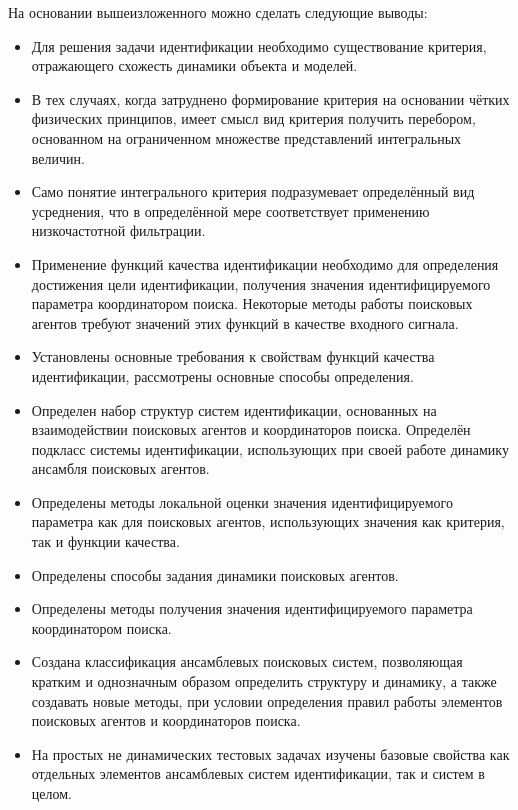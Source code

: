 На основании вышеизложенного можно сделать следующие выводы:

\begin{itemize}

  \item
    Для решения задачи идентификации необходимо существование критерия,
    отражающего схожесть динамики объекта и моделей.

  \item
    В тех случаях, когда затруднено формирование критерия на основании чётких
    физических принципов, имеет смысл вид критерия получить перебором,
    основанном на ограниченном множестве представлений интегральных величин.

  \item
    Само понятие интегрального критерия подразумевает определённый вид усреднения,
    что в определённой мере соответствует применению низкочастотной фильтрации.

  \item
    Применение функций качества идентификации необходимо
    для определения достижения цели идентификации,
    получения значения идентифицируемого параметра координатором поиска.
    Некоторые методы работы поисковых агентов требуют значений
    этих функций в качестве входного сигнала.

  \item
    Установлены основные требования к свойствам функций качества идентификации,
    рассмотрены основные способы определения.

  \item
    Определен набор структур систем идентификации, основанных
    на взаимодействии поисковых агентов и координаторов поиска.
    Определён подкласс системы идентификации, использующих
    при своей работе динамику ансамбля поисковых агентов.

  \item
    Определены методы локальной оценки значения идентифицируемого параметра
    как для поисковых агентов, использующих значения как критерия,
    так и функции качества.

  \item
    Определены способы задания динамики поисковых агентов.

  \item
    Определены методы получения значения идентифицируемого параметра координатором поиска.

  \item
    Создана классификация ансамблевых поисковых систем, позволяющая
    кратким и однозначным образом определить структуру и динамику,
    а также создавать новые методы, при условии определения правил
    работы элементов поисковых агентов и координаторов поиска.

  \item
    На простых не динамических тестовых задачах
    изучены базовые свойства как отдельных элементов ансамблевых систем идентификации,
    так и систем в целом.


\end{itemize}

